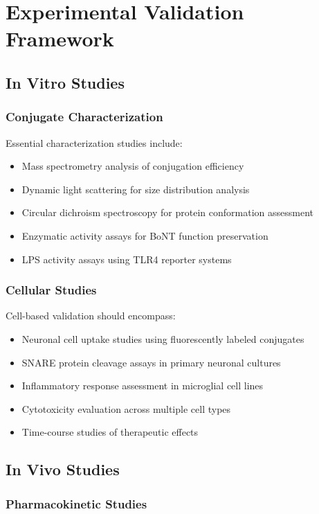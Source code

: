 \documentclass[11pt,a4paper]{article}
\begin{document}
\section{Experimental Validation Framework}

\subsection{In Vitro Studies}

\subsubsection{Conjugate Characterization}

Essential characterization studies include:
\begin{itemize}
\item Mass spectrometry analysis of conjugation efficiency
\item Dynamic light scattering for size distribution analysis
\item Circular dichroism spectroscopy for protein conformation assessment
\item Enzymatic activity assays for BoNT function preservation
\item LPS activity assays using TLR4 reporter systems
\end{itemize}

\subsubsection{Cellular Studies}

Cell-based validation should encompass:
\begin{itemize}
\item Neuronal cell uptake studies using fluorescently labeled conjugates
\item SNARE protein cleavage assays in primary neuronal cultures
\item Inflammatory response assessment in microglial cell lines
\item Cytotoxicity evaluation across multiple cell types
\item Time-course studies of therapeutic effects
\end{itemize}

\subsection{In Vivo Studies}

\subsubsection{Pharmacokinetic Studies}
\end{document}

